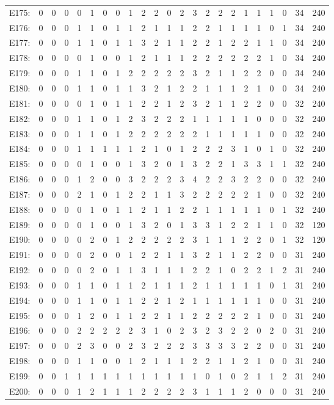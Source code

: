 \documentclass[12pt]{article}
\begin{document}
\begin{center}
\begin{tabular}{ccccccccccccccccccccc|c|c}
E175:&0&0&0&0&1&0&0&1&2&2&0&2&3&2&2&2&1&1&1&0&34&240\\
E176:&0&0&0&1&1&0&1&1&2&1&1&1&2&2&1&1&1&1&0&1&34&240\\
E177:&0&0&0&1&1&0&1&1&3&2&1&1&2&2&1&2&2&1&1&0&34&240\\
E178:&0&0&0&0&1&0&0&1&2&1&1&1&2&2&2&2&2&2&1&0&34&240\\
E179:&0&0&0&1&1&0&1&2&2&2&2&2&3&2&1&1&2&2&0&0&34&240\\
E180:&0&0&0&1&1&0&1&1&3&2&1&2&2&1&1&1&2&1&0&0&34&240\\
E181:&0&0&0&0&1&0&1&1&2&2&1&2&3&2&1&1&2&2&0&0&32&240\\
E182:&0&0&0&1&1&0&1&2&3&2&2&2&1&1&1&1&1&0&0&0&32&240\\
E183:&0&0&0&1&1&0&1&2&2&2&2&2&2&1&1&1&1&1&0&0&32&240\\
E184:&0&0&0&1&1&1&1&1&2&1&0&1&2&2&2&3&1&0&1&0&32&240\\
E185:&0&0&0&0&1&0&0&1&3&2&0&1&3&2&2&1&3&3&1&1&32&240\\
E186:&0&0&0&1&2&0&0&3&2&2&2&3&4&2&2&3&2&2&0&0&32&240\\
E187:&0&0&0&2&1&0&1&2&2&1&1&3&2&2&2&2&2&1&0&0&32&240\\
E188:&0&0&0&0&1&0&1&1&2&1&1&2&2&1&1&1&1&1&0&1&32&240\\
E189:&0&0&0&0&1&0&0&1&3&2&0&1&3&3&1&2&2&1&1&0&32&120\\
E190:&0&0&0&0&2&0&1&2&2&2&2&2&3&1&1&1&2&2&0&1&32&120\\
E191:&0&0&0&0&2&0&0&1&2&2&1&1&3&2&1&1&2&2&0&0&31&240\\
E192:&0&0&0&0&2&0&1&1&3&1&1&1&2&2&1&0&2&2&1&2&31&240\\
E193:&0&0&0&1&1&0&1&1&2&1&1&1&2&1&1&1&1&1&0&1&31&240\\
E194:&0&0&0&1&1&0&1&1&2&2&1&2&1&1&1&1&1&1&0&0&31&240\\
E195:&0&0&0&1&2&0&1&1&2&2&1&1&2&2&2&2&2&1&0&0&31&240\\
E196:&0&0&0&2&2&2&2&2&3&1&0&2&3&2&3&2&2&0&2&0&31&240\\
E197:&0&0&0&2&3&0&0&2&3&2&2&2&3&3&3&3&2&2&0&0&31&240\\
E198:&0&0&0&1&1&0&0&1&2&1&1&1&2&2&1&1&2&1&0&0&31&240\\
E199:&0&0&1&1&1&1&1&1&1&1&1&1&1&0&1&0&2&1&1&2&31&240\\
E200:&0&0&0&1&2&1&1&1&2&2&2&2&3&1&1&1&2&0&0&0&31&240\\
\end{tabular}
\end{center}
\end{document}
